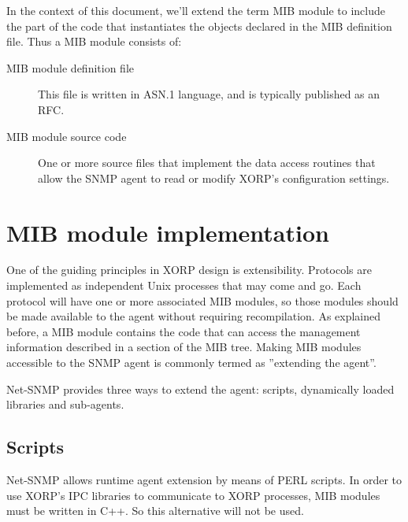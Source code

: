 \documentclass[11pt]{article}
\begin{document}
In the context of this document, we'll extend the term MIB module to include the
part of the code that instantiates the objects declared in the MIB definition
file.  Thus a MIB module consists of:

\begin{description}
    \item[MIB module definition file] This file is written in ASN.1 language, and is
typically published as an RFC.
    \item[MIB module source code] One or more source files that implement the data
access routines that allow the SNMP agent to read or modify XORP's configuration settings. 
\end{description} 






\section{MIB module implementation}
\label{sec:mib_module_implementation}

One of the guiding principles in XORP design is extensibility.  Protocols are
implemented as independent Unix processes that may come and go.  Each protocol
will have one or more associated MIB modules, so those modules should be made
available to the agent without requiring recompilation.  
As explained before, a MIB module contains the code that can access the
management information described in a section of the MIB tree.  Making MIB
modules accessible to the SNMP agent is commonly termed as ''extending the agent''.

Net-SNMP provides three ways to extend the agent:  scripts, dynamically loaded
libraries and sub-agents.


\subsection{Scripts}

Net-SNMP allows runtime agent extension by means of PERL scripts.  In order to
use XORP's IPC libraries to communicate to XORP processes, MIB modules must be
written in C++.  So this alternative will not be used.

\end{document}
